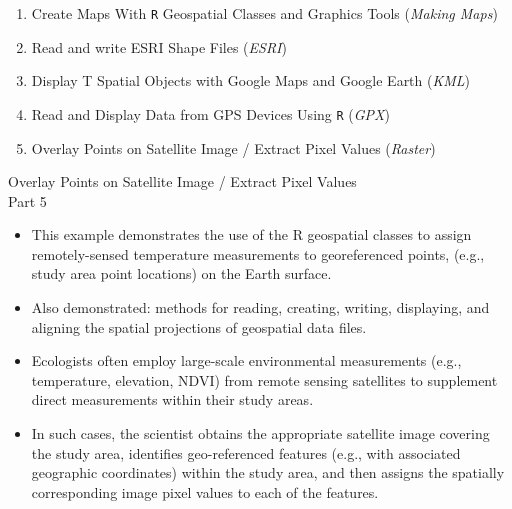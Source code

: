 \documentclass{beamer}
\begin{document}
\begin{frame}
\Large
\begin{enumerate}
\item Create Maps With \texttt{R} Geospatial Classes and Graphics Tools (\textit{Making Maps})
\item Read and write ESRI Shape Files (\textit{ESRI})
\item Display T Spatial Objects with Google Maps and Google Earth (\textit{KML})
\item Read and Display Data from GPS Devices Using \texttt{R} (\textit{GPX})
\item Overlay Points on Satellite Image / Extract Pixel Values (\textit{Raster})
\end{enumerate}
\end{frame}

\begin{frame}
\huge
Overlay Points on Satellite Image / Extract Pixel Values
\\ Part 5
\end{frame}
\begin{frame}
\begin{itemize}
\item This example demonstrates the use of the R geospatial classes to assign remotely-sensed temperature measurements to georeferenced points, (e.g., study area point locations) on the Earth surface. \item Also demonstrated: methods for reading, creating, writing, displaying, and aligning the spatial projections of geospatial data files.
\end{itemize}
\end{frame}

\begin{frame}
\begin{itemize}
\item Ecologists often employ large-scale environmental measurements (e.g., temperature, elevation, NDVI) from remote sensing satellites to supplement direct measurements within their study areas. \item In such cases, the scientist obtains the appropriate satellite image covering the study area, identifies geo-referenced features (e.g., with associated geographic coordinates) within the study area, and then assigns the spatially corresponding image pixel values to each of the features.
\end{itemize}
\end{frame}
\end{document}
